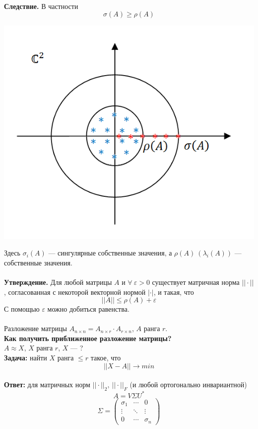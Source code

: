 \documentclass[12pt]{article}
\theoremstyle{definition}
\numberwithin{equation}{section}
\begin{document}
	\\
	\textbf{Следствие.} В частности $$\sigma(A)\geqslant \rho(A)$$
	\begin{center}
		\includegraphics[scale=0.6]{l8_3.png}\end{center}
	Здесь $\sigma_i(A)$ --- сингулярные собственные значения, а $\rho(A)~(\lambda_i(A))$ --- собственные значения.\\ \\
	\textbf{Утверждение.} Для любой матрицы $A$ и $\forall~ \varepsilon>0$ существует матричная норма $||\cdot ||$, согласованная с некоторой векторной нормой $|\cdot|$, и такая, что $$||A||\leqslant \rho(A) + \varepsilon$$
	С помощью $\varepsilon$ можно добиться равенства.\\
	\\
	Разложение матрицы $A_{n \times n}=A_{n \times r} \cdot A_{r \times
		n}$, $A$ ранга $r$.\\
	\textbf{Как получить приближенное разложение матрицы?}\\
	$A\approx X$, $X$ ранга $r$, $X$ --- ?\\
	\textbf{Задача:} найти $X$ ранга $\leqslant r$ такое, что $$||X-A||\to min$$\\
	\textbf{Ответ:} для матричных норм $||\cdot||_2,~||\cdot||_F$ (и любой ортогонально инвариантной) $$A=V\Sigma U^*$$
	\[\Sigma=\begin{pmatrix}
	\sigma_1 & \cdots & 0\\
	\vdots & \ddots & \vdots\\
	0 & \cdots & \sigma_n
	\end{pmatrix}\]
\end{document}
